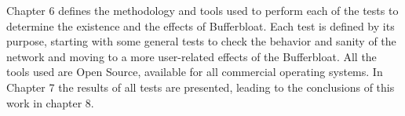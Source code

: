 Chapter 6 defines the methodology and tools used to
perform each of the tests to determine the existence and the effects of
Bufferbloat. Each test is defined by its purpose, starting with some general
tests to check the behavior and sanity of the network and moving to a more
user-related effects of the Bufferbloat. All the tools used are Open Source, available for all commercial operating systems. In Chapter 7 the
results of all tests are presented, leading to the conclusions of this work in
chapter 8.
